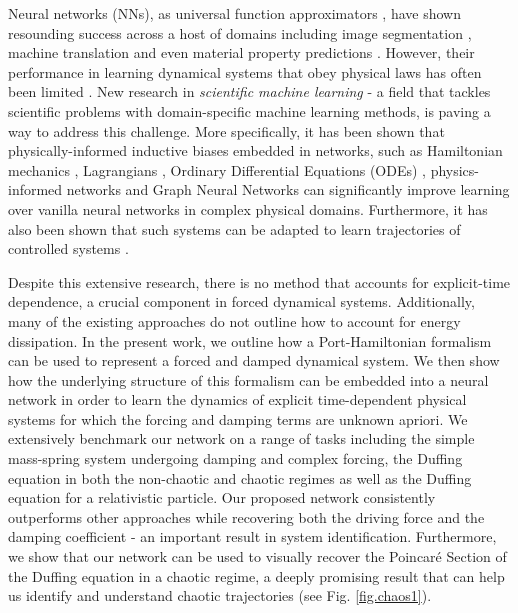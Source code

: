 \documentclass{article}
\begin{document}
Neural networks (NNs), as universal function approximators \cite{hornik_multilayer_1989}, have shown resounding success across a host of domains including image segmentation \cite{he_mask_2018}, machine translation \cite{devlin_bert_2019} and even material property predictions \cite{toussaint_differentiable_2018,yao_tensormol-01_2018}. However, their performance in learning dynamical systems that obey physical laws has often been limited \cite{greydanus_hamiltonian_2019,pukrittayakamee_simultaneous_2009}. New research in \textit{scientific machine learning} - a field that tackles scientific problems with domain-specific machine learning methods, is paving a way to address this challenge. More specifically, it has been shown that physically-informed inductive biases embedded in networks, such as Hamiltonian mechanics \cite{mattheakis_hamiltonian_2020, greydanus_hamiltonian_2019}, Lagrangians \cite{cranmer_lagrangian_2020, lutter_deep_2019}, Ordinary Differential Equations (ODEs) \cite{chen_neural_2018}, physics-informed networks \cite{raissi_physics_2017} and Graph Neural Networks \cite{battaglia_interaction_2016,sanchez-gonzalez_hamiltonian_2019} can significantly improve learning over vanilla neural networks in complex physical domains. Furthermore, it has also been shown that such systems can be adapted to learn trajectories of controlled systems \cite{lutter_deep_2019,zhong_dissipative_2020}. 

Despite this extensive research, there is no method that accounts for explicit-time dependence, a crucial component in forced dynamical systems. Additionally, many of the existing approaches do not outline how to account for energy dissipation. In the present work, we outline how a Port-Hamiltonian formalism can be used to represent a forced and damped dynamical system. We then show how the underlying structure of this formalism can be embedded into a neural network in order to learn the dynamics of explicit time-dependent physical systems for which the forcing and damping terms are unknown apriori. We extensively benchmark our network on a range of tasks including the simple mass-spring system undergoing damping and complex forcing, the Duffing equation in both the non-chaotic and chaotic regimes as well as the Duffing equation for a relativistic particle. Our proposed network consistently outperforms other approaches while recovering both the driving force and the damping coefficient - an important result in system identification. Furthermore, we show that our network can be used to visually recover the Poincar\'e Section of the Duffing equation in a chaotic regime, a deeply promising result that can help us identify and understand chaotic trajectories (see Fig. \ref{fig.chaos1}).
\end{document}
